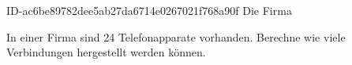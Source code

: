 \begin{exercise}
      {ID-ac6be89782dee5ab27da6714e0267021f768a90f}
      {Die Firma}
  \ifproblem\problem\par
    In einer Firma sind 24 Telefonapparate vorhanden. Berechne wie viele
    Verbindungen hergestellt werden können.
  \fi
\end{exercise}
